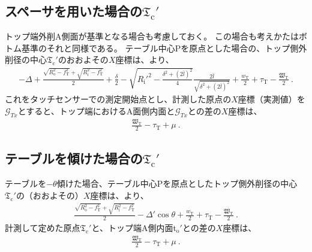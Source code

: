 \clearpage


\subsection[スペーサを用いた場合の\texorpdfstring{$\mathfrak T_\mathrm c'$}{Tc'}]
           {スペーサを用いた場合の$\boldsymbol{\mathfrak T_\mathrm c'}$}
トップ端外削A側面が基準となる場合も考慮しておく。
この場合も考えかたはボトム基準のそれと同様である。
テーブル中心Pを原点とした場合の、トップ側外削径の中心$\mathfrak T_\mathrm c'$のおおよその$X$座標は、より、
\begin{align*}
  -\varDelta+\frac{\sqrt{R_\mathrm o^2-f_\mathrm T^2}+\sqrt{R_\mathrm i^2-f_\mathrm T^2}}2+\frac\delta2
  -\sqrt{R_\mathrm i'^2-\frac{\delta^2+(2\bar l)^2}4}\frac{2\bar l}{\sqrt{\delta^2+(2\bar l)^2}}
  +\frac{w_\mathrm T}2+\tau_\mathrm T-\frac{\mathfrak W_\mathrm T}2\ .
\end{align*}
これをタッチセンサーでの測定開始点とし、計測した原点の$X$座標（実測値）を$\mathcal G_{Tx}$とすると、トップ端におけるA面側内面と$\mathcal G_{Tx}$との差の$X$座標は、
\begin{align*}
  \frac{\mathfrak W_\mathrm T}2-\tau_\mathrm T+\mu~.
\end{align*}


\subsection[テーブルを傾けた場合の\texorpdfstring{$\mathfrak T_\mathrm c'$}{Tc'}]
           {テーブルを傾けた場合の$\boldsymbol{\mathfrak T_\mathrm c'}$}
テーブルを$-\theta$傾けた場合、テーブル中心Pを原点としたトップ側外削径の中心$\mathfrak T_\mathrm c'$の（おおよその）$X$座標は、より、
\begin{align}
  \label{eq:gaisakucenterTt}
  \frac{\sqrt{R_\mathrm o^2-f_\mathrm T^2}+\sqrt{R_\mathrm i^2-f_\mathrm T^2}}2-\varDelta'\cos\theta
  +\frac{w_\mathrm T}2+\tau_\mathrm T-\frac{\mathfrak W_\mathrm T}2\ .
\end{align}
計測して定めた原点$\mathfrak T_\mathrm c'$と、トップ端A側内面t$_\mathrm o'$との差の$X$座標は、
\begin{align}
  \label{eq:gaisakucenterTr}
  \frac{\mathfrak W_\mathrm T}2-\tau_\mathrm T+\mu~.
\end{align}




